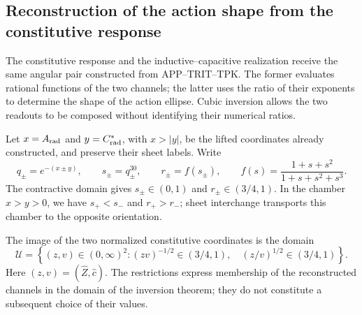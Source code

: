 \subsection{Reconstruction of the action shape from the constitutive response}
\label{iii:subsec:puente-forma-LC}

The constitutive response and the inductive--capacitive realization receive
the same angular pair constructed from APP--TRIT--TPK. The former evaluates
rational functions of the two channels; the latter uses the ratio of
their exponents to determine the shape of the action ellipse. Cubic
inversion allows the two readouts to be composed without identifying their
numerical ratios.

Let $x=A_{\rm rad}$ and $y=C^*_{\rm rad}$, with $x>|y|$, be the lifted
coordinates already constructed, and preserve their sheet labels. Write
\begin{equation}
 q_\pm=e^{-(x\pm y)},\qquad s_\pm=q_\pm^{30},\qquad
 r_\pm=f(s_\pm),\qquad
 f(s)=\frac{1+s+s^2}{1+s+s^2+s^3}.
 \label{iii:eq:forma-canales}
\end{equation}
The contractive domain gives $s_\pm\in(0,1)$ and
$r_\pm\in(3/4,1)$. In the chamber $x>y>0$, we have
$s_+<s_-$ and $r_+>r_-$; sheet interchange transports this chamber
to the opposite orientation.

The image of the two normalized constitutive coordinates is the domain
\begin{equation}
 \mathcal U=\left\{(z,v)\in(0,\infty)^2:
   (zv)^{-1/2}\in(3/4,1),\quad
   (z/v)^{1/2}\in(3/4,1)\right\}.
 \label{iii:eq:forma-dominio}
\end{equation}
Here $(z,v)=(\widehat Z,\widehat c)$. The restrictions express
membership of the reconstructed channels in the domain of the inversion
theorem; they do not constitute a subsequent choice of their values.

